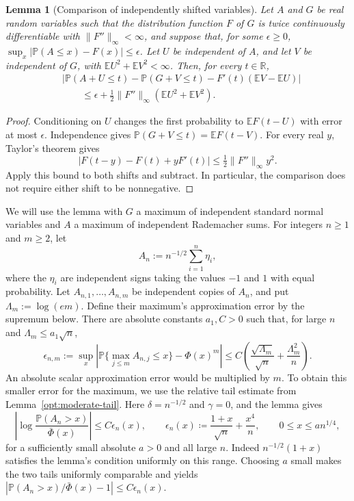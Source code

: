\documentclass[11pt,letterpaper]{article}
\newtheorem{lemma}{Lemma}
\theoremstyle{remark}
\newcommand{\E}{\mathbb E}
\newcommand{\Pp}{\mathbb P}
\newcommand{\R}{\mathbb R}
\begin{document}
\begin{lemma}[Comparison of independently shifted variables]
\label{lower:shift-comparison}
Let \(A\) and \(G\) be real random variables such that the distribution
function \(F\) of \(G\) is twice continuously differentiable with
\(\|F''\|_\infty<\infty\), and suppose that, for some \(\epsilon\ge0\),
\(\sup_x|\Pp(A\le x)-F(x)|\le\epsilon\).
Let \(U\) be independent of \(A\), and let \(V\) be independent of \(G\),
with \(\E U^2+\E V^2<\infty\). Then, for every \(t\in\R\),
\begin{equation}
\begin{split}
&\left|\Pp(A+U\le t)-\Pp(G+V\le t)
       -F'(t)(\E V-\E U)\right|\\
&\hspace{2em}\le \epsilon+
       \frac12\|F''\|_\infty(\E U^2+\E V^2).
\end{split}
\label{lower:eq:shift-comparison}
\end{equation}
\end{lemma}

\begin{proof}
Conditioning on \(U\) changes the first probability to
\(\E F(t-U)\) with error at most \(\epsilon\). Independence gives
\(\Pp(G+V\le t)=\E F(t-V)\). For every real \(y\), Taylor's theorem gives
\[
 |F(t-y)-F(t)+yF'(t)|\le \tfrac12\|F''\|_\infty y^2.
\]
Apply this bound to both shifts and subtract. In particular, the
comparison does not require either shift to be nonnegative.
\end{proof}

We will use the lemma with \(G\) a maximum of independent standard
normal variables and \(A\) a maximum of independent Rademacher sums.
For integers \(n\ge1\) and \(m\ge2\), let
\[
 A_n:=n^{-1/2}\sum_{i=1}^n\eta_i,
\]
where the \(\eta_i\) are independent signs taking the values
\(-1\) and \(1\) with equal probability. Let
\(A_{n,1},\ldots,A_{n,m}\) be independent copies of \(A_n\), and put
\(\Lambda_m:=\log(em)\). Define their maximum's approximation error
by the supremum below. There are absolute constants \(a_1,C>0\)
such that, for large \(n\) and \(\Lambda_m\le a_1\sqrt n\),
\begin{equation}
 \epsilon_{n,m}:=\sup_x\left|\Pp\{\max_{j\le m}A_{n,j}\le x\}-\Phi(x)^m\right|
 \le C\left(\frac{\sqrt{\Lambda_m}}{\sqrt n}
                 +\frac{\Lambda_m^2}{n}\right).
 \label{sym:eq:rademacher-max}
\end{equation}
An absolute scalar approximation error would be multiplied by \(m\).
To obtain this smaller error for the maximum, we use the relative
tail estimate from Lemma~\ref{opt:moderate-tail}. Here
\(\delta=n^{-1/2}\) and \(\gamma=0\), and the lemma gives
\[
 \left|\log\frac{\Pp(A_n>x)}{\bar\Phi(x)}\right|
 \le C\epsilon_n(x),\qquad
 \epsilon_n(x)\coloneqq\frac{1+x}{\sqrt n}+\frac{x^4}{n},
 \qquad 0\le x\le an^{1/4},
\]
for a sufficiently small absolute \(a>0\) and all large \(n\).
Indeed \(n^{-1/2}(1+x)\) satisfies the lemma's condition uniformly
on this range. Choosing \(a\) small makes the two tails uniformly
comparable and yields
\(\left|\Pp(A_n>x)/\bar\Phi(x)-1\right|\le C\epsilon_n(x)\).
\end{document}
